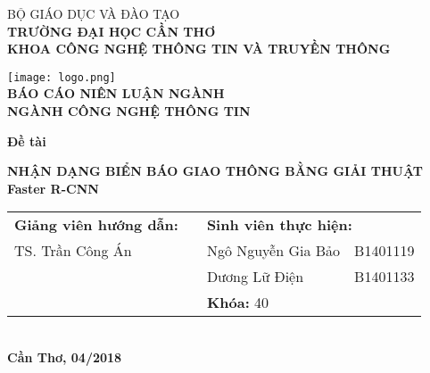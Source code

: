 \documentclass[../thesis.tex]{subfiles}
\begin{document}
\begin{titlepage}

\begin{center}

BỘ GIÁO DỤC VÀ ĐÀO TẠO\\
\textbf{TRƯỜNG ĐẠI HỌC CẦN THƠ\\}
\textbf{KHOA CÔNG NGHỆ THÔNG TIN VÀ TRUYỀN THÔNG\\[1cm]}

\texttt{[image: logo.png]}\\[1cm]

\textbf{BÁO CÁO NIÊN LUẬN NGÀNH\\}
\textbf{NGÀNH CÔNG NGHỆ THÔNG TIN\\[2cm]}

\begin{large}
\textbf{Đề tài\\[0.5cm]}
\end{large}
\textbf{{\LARGE NHẬN DẠNG BIỂN BÁO GIAO THÔNG BẰNG GIẢI THUẬT Faster R-CNN}}
\\[3.5cm]

\begin{tabular}{ l c l l }
	 \textbf{Giảng viên hướng dẫn:} & \hspace{2cm} & \multicolumn{2}{l}{\textbf{Sinh viên thực hiện:}}\\
	 TS. Trần Công Án & & Ngô Nguyễn Gia Bảo &
	 B1401119\\
	 & & Dương Lữ Điện & B1401133\\
	 & & \multicolumn{2}{l}{\textbf{Khóa:} 40}
\end{tabular}
\\[4cm]

\textbf{Cần Thơ, 04/2018}

\end{center}

\end{titlepage}
\end{document}
